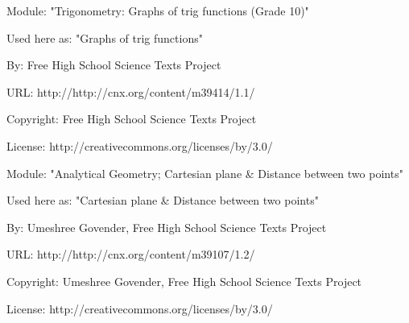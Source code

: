       \par\vspace{9pt}\noindent\begin{minipage}{\textwidth}
      Module: "Trigonometry: Graphs of trig functions (Grade 10)" \par\nopagebreak\noindent
      Used here as: "Graphs of trig functions" \par\nopagebreak\noindent
        By: Free High School Science Texts Project\par\nopagebreak\noindent
      URL: http://http://cnx.org/content/m39414/1.1/\par\nopagebreak\noindent
      \par\nopagebreak\noindent
      Copyright: Free High School Science Texts Project\par\nopagebreak\noindent
      License:  http://creativecommons.org/licenses/by/3.0/\par\nopagebreak\noindent
      \par\end{minipage}
      \par\vspace{9pt}\noindent\begin{minipage}{\textwidth}
      Module: "Analytical Geometry; Cartesian plane \& Distance between two points" \par\nopagebreak\noindent
      Used here as: "Cartesian plane \& Distance between two points" \par\nopagebreak\noindent
        By: Umeshree Govender, Free High School Science Texts Project\par\nopagebreak\noindent
      URL: http://http://cnx.org/content/m39107/1.2/\par\nopagebreak\noindent
      \par\nopagebreak\noindent
      Copyright: Umeshree Govender, Free High School Science Texts Project\par\nopagebreak\noindent
      License:  http://creativecommons.org/licenses/by/3.0/\par\nopagebreak\noindent
      \par\end{minipage}
